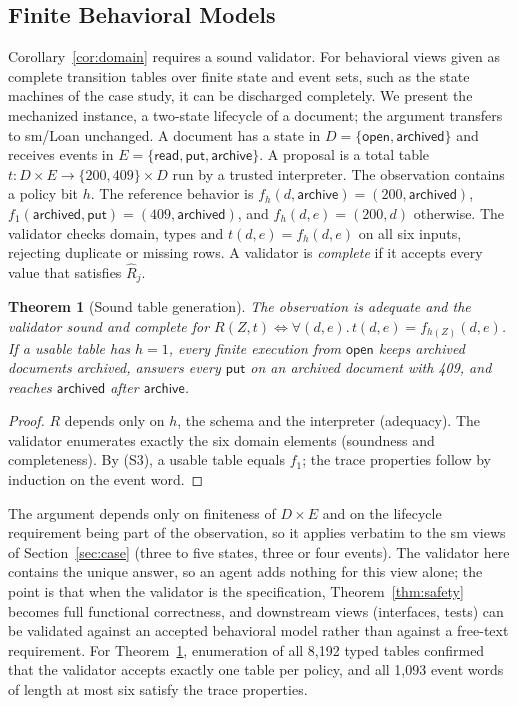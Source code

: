\documentclass[pdflatex,sn-mathphys-num]{sn-jnl}
\theoremstyle{thmstyleone}%
\newtheorem{theorem}{Theorem}%
\theoremstyle{thmstyletwo}%
\theoremstyle{thmstylethree}%
\newcommand{\vw}[1]{\textsf{#1}}
\newcommand{\PolicyTables}{8,192}
\newcommand{\EventWords}{1,093}
\begin{document}
\begin{appendices}

\section{Finite Behavioral Models}\label{app:finite}
Corollary~\ref{cor:domain} requires a sound validator. For behavioral views given as complete transition tables over finite state and event sets, such as the state machines of the case study, it can be discharged completely. We present the mechanized instance, a two-state lifecycle of a document; the argument transfers to \vw{sm/Loan} unchanged. A document has a state in $D=\{\mathsf{open},\mathsf{archived}\}$ and receives events in $E=\{\mathsf{read},\mathsf{put},\mathsf{archive}\}$. A proposal is a total table $t:D\times E\to\{200,409\}\times D$ run by a trusted interpreter. The observation contains a policy bit $h$. The reference behavior is $f_h(d,\mathsf{archive})=(200,\mathsf{archived})$, $f_1(\mathsf{archived},\mathsf{put})=(409,\mathsf{archived})$, and $f_h(d,e)=(200,d)$ otherwise. The validator checks domain, types and $t(d,e)=f_h(d,e)$ on all six inputs, rejecting duplicate or missing rows. A validator is \emph{complete} if it accepts every value that satisfies $\widehat R_j$.

\begin{theorem}[Sound table generation]\label{thm:table}
The observation is adequate and the validator sound and complete for $R(Z,t)\iff\forall(d,e).\,t(d,e)=f_{h(Z)}(d,e)$. If a usable table has $h=1$, every finite execution from $\mathsf{open}$ keeps archived documents archived, answers every $\mathsf{put}$ on an archived document with 409, and reaches $\mathsf{archived}$ after $\mathsf{archive}$.
\end{theorem}
\begin{proof}
$R$ depends only on $h$, the schema and the interpreter (adequacy). The validator enumerates exactly the six domain elements (soundness and completeness). By (S3), a usable table equals $f_1$; the trace properties follow by induction on the event word.
\end{proof}
The argument depends only on finiteness of $D\times E$ and on the lifecycle requirement being part of the observation, so it applies verbatim to the \vw{sm} views of Section~\ref{sec:case} (three to five states, three or four events). The validator here contains the unique answer, so an agent adds nothing for this view alone; the point is that when the validator is the specification, Theorem~\ref{thm:safety} becomes full functional correctness, and downstream views (interfaces, tests) can be validated against an accepted behavioral model rather than against a free-text requirement. For Theorem~\ref{thm:table}, enumeration of all \PolicyTables{} typed tables confirmed that the validator accepts exactly one table per policy, and all \EventWords{} event words of length at most six satisfy the trace properties.


\end{appendices}
\end{document}
